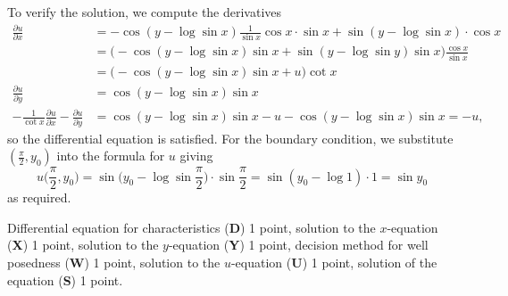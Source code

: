 \begin{loesung}
\begin{teilaufgaben}
To verify the solution, we compute the derivatives
\begin{align*}
\frac{\partial u}{\partial x}
&=
-\cos(y-\log\sin x)\frac{1}{\sin x}\cos x\cdot \sin x
+
\sin(y-\log\sin x)\cdot \cos x
\\
&=\biggl(-\cos(y-\log\sin x)\sin x + \sin(y-\log\sin y)\sin x\biggr)
\frac{\cos x}{\sin x}
\\
&=
\biggl(-\cos(y-\log\sin x)\sin x + u\biggr) \cot x
\\
\frac{\partial u}{\partial y}
&=
\cos(y-\log\sin x) \sin x
\\
-\frac{1}{\cot x}\frac{\partial u}{\partial x}-\frac{\partial u}{\partial y}
&=
\cos(y-\log\sin x)\sin x - u - \cos(y-\log\sin x)\sin x
=
-u,
\end{align*}
so the differential equation is satisfied.
For the boundary condition, we substitute $(\frac{\pi}2,y_0)$ into the
formula for $u$ giving
\[
u\biggl(\frac{\pi}2,y_0\biggr)
=
\sin\biggl(y_0-\log\sin\frac{\pi}2\biggr)\cdot \sin\frac{\pi}2
=
\sin(y_0 - \log 1)\cdot 1
=
\sin y_0
\]
as required.
\qedhere
\end{teilaufgaben}
\end{loesung}

\begin{bewertung}
Differential equation for characteristics ({\bf D}) 1 point,
solution to the $x$-equation ({\bf X}) 1 point,
solution to the $y$-equation ({\bf Y}) 1 point,
decision method for well posedness ({\bf W}) 1 point,
solution to the $u$-equation ({\bf U}) 1 point,
solution of the equation ({\bf S}) 1 point.
\end{bewertung}
